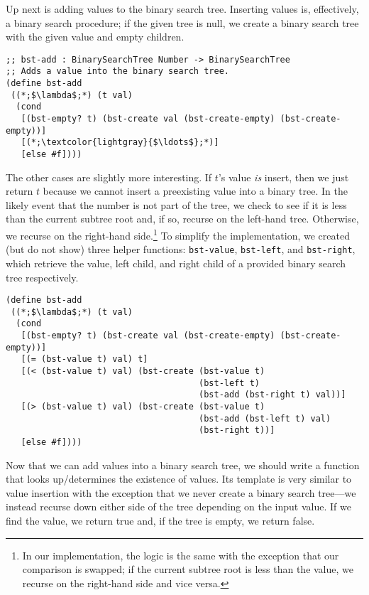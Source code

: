 Up next is adding values to the binary search tree. Inserting values is, effectively, a binary search procedure; if the given tree is null, we create a binary search tree with the given value and empty children.

\begin{cl}[]{}\begin{lstlisting}[language=MyScheme]
;; bst-add : BinarySearchTree Number -> BinarySearchTree
;; Adds a value into the binary search tree.
(define bst-add
 ((*;$\lambda$;*) (t val)
  (cond
   [(bst-empty? t) (bst-create val (bst-create-empty) (bst-create-empty))]
   [(*;\textcolor{lightgray}{$\ldots$};*)]
   [else #f])))
\end{lstlisting}\end{cl}

The other cases are slightly more interesting. If $t$'s value \textit{is} insert, then we just return $t$ because we cannot insert a preexisting value into a binary tree. In the likely event that the number is not part of the tree, we check to see if it is less than the current subtree root and, if so, recurse on the left-hand tree. Otherwise, we recurse on the right-hand side.\footnote{In our implementation, the logic is the same with the exception that our comparison is swapped; if the current subtree root is less than the value, we recurse on the right-hand side and vice versa.} To simplify the implementation, we created (but do not show) three helper functions: \texttt{bst-value}, \texttt{bst-left}, and \texttt{bst-right}, which retrieve the value, left child, and right child of a provided binary search tree respectively.

\begin{cl}[]{}\begin{lstlisting}[language=MyScheme]
(define bst-add
 ((*;$\lambda$;*) (t val)
  (cond
   [(bst-empty? t) (bst-create val (bst-create-empty) (bst-create-empty))]
   [(= (bst-value t) val) t]
   [(< (bst-value t) val) (bst-create (bst-value t)
                                      (bst-left t)
                                      (bst-add (bst-right t) val))]
   [(> (bst-value t) val) (bst-create (bst-value t)
                                      (bst-add (bst-left t) val)
                                      (bst-right t))]
   [else #f])))
\end{lstlisting}\end{cl}

Now that we can add values into a binary search tree, we should write a function that looks up/determines the existence of values. Its template is very similar to value insertion with the exception that we never create a binary search tree---we instead recurse down either side of the tree depending on the input value. If we find the value, we return true and, if the tree is empty, we return false.

